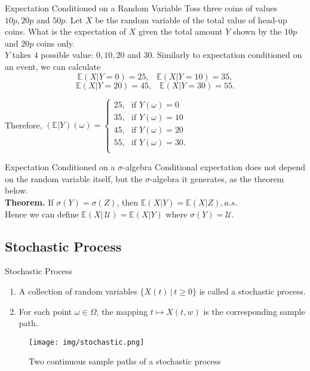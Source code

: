 \begin{frame}{Expectation Conditioned on a Random Variable}
 Toss three coins of values $10p, 20p$ and $50p$. Let $X$ be the random variable of the total value of head-up coins. What is the expectation of $X$ given the total amount $Y$ shown by the $10p$ and $20p$ coins only.\\

 $Y$ takes $4$ possible value: $0,10,20$ and $30$. Similarly to expectation conditioned on an event, we can calculate\\
 $$\mathbb{E}(X|Y=0)=25,\,\,\,\,\,\mathbb{E}(X|Y=10)=35,$$
 $$\mathbb{E}(X|Y=20)=45,\,\,\,\,\,\mathbb{E}(X|Y=30)=55.$$

 Therefore, $(\mathbb{E}|Y)(\omega)=\begin{cases}
     25,\,\,\text{ if } Y(\omega)=0\\
     35,\,\,\text{ if } Y(\omega)=10\\
     45,\,\,\text{ if } Y(\omega)=20\\
     55,\,\,\text{ if } Y(\omega)=30.\\
 \end{cases}$
\end{frame}

\begin{frame}{Expectation Conditioned on a $\sigma$-algebra}
    Conditional expectation does not depend on the random variable itself, but the $\sigma$-algebra it generates, as the theorem below.\\
    
    \textbf{Theorem.} If $\sigma(Y)=\sigma(Z)$, then $\mathbb{E}(X|Y)=\mathbb{E}(X|Z), a.s.$\\

    Hence we can define $\mathbb{E}(X|\,\mathcal{U}) = \mathbb{E}(X|Y)$ where $\sigma(Y)=\mathcal{U}$.\\
\end{frame}

\subsection{Stochastic Process}
\begin{frame}{Stochastic Process}
    \begin{enumerate}
    \item A collection of random variables $\{X(t)\,|\,t\ge0\}$ is called a stochastic process.
    \item For each point $\omega\in\Omega$, the mapping $t\mapsto X(t,w)$ is the corresponding sample path.
\end{enumerate}
\begin{figure}
    \centering
    \texttt{[image: img/stochastic.png]}
    \caption{Two continuous sample paths of a stochastic process}
\end{figure}
\end{frame}

